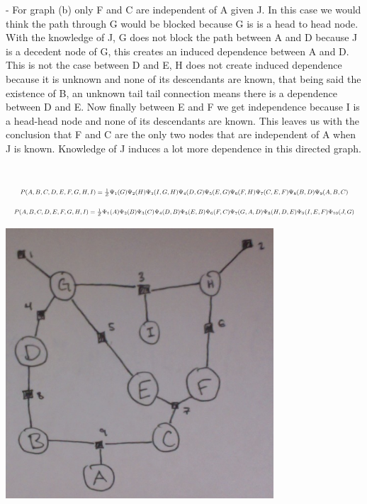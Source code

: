 \documentclass[solution, letterpaper]{cs121}
\begin{document}
\begin{empfile}
- For graph (b) only F and C are independent of A given J. In this case we would think the path through G would be blocked because G is is a head to head node. With the knowledge of J, G does not block the path between A and D because J is a decedent node of G, this creates an induced dependence between A and D. This is not the case between D and E, H does not create induced dependence because it is unknown and none of its descendants are known, that being said the existence of B, an unknown tail tail connection means there is a dependence between D and E. Now finally between E and F we get independence because I is a head-head node and none of its descendants are known. This leaves us with the conclusion that F and C are the only two nodes that are independent of A when J is known. Knowledge of J induces a lot more dependence in this directed graph.

\subproblem \\%
\begin{equation*}
\resizebox{1\hsize}{!}{$P(A,B,C,D,E,F,G,H,I) = \frac{1}{Z}\Psi_1(G)\Psi_2(H)\Psi_3(I,G,H)\Psi_4(D,G)\Psi_5(E,G)\Psi_6(F,H)\Psi_7(C,E,F)\Psi_8(B,D)\Psi_9(A,B,C)$}
\end{equation*}
\begin{equation*}
\resizebox{1\hsize}{!}{$P(A,B,C,D,E,F,G,H,I) = \frac{1}{Z}\Psi_1(A)\Psi_2(B)\Psi_3(C)\Psi_4(D,B)\Psi_5(E,B)\Psi_6(F,C)\Psi_7(G,A,D)\Psi_8(H,D,E)\Psi_9(I,E,F)\Psi_{10}(J,G)$}
\end{equation*}
\subproblem %
\begin{center}
\includegraphics[width=100mm]{factor_graph_a.png}
\end{center}


\end{empfile}
\end{document}
